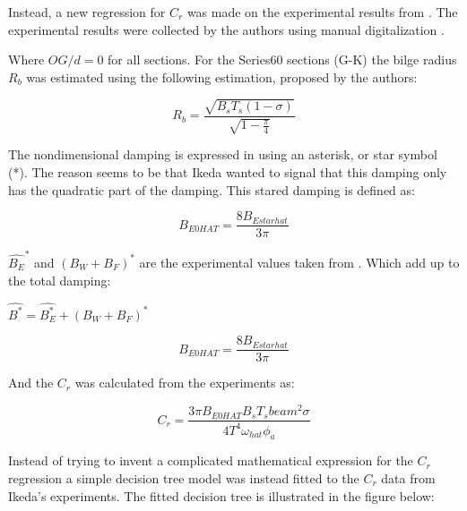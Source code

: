 Instead, a new regression for $C_r$ was made on the experimental
results from \cite{7505983/4AFVVGNT}. The experimental results were
collected by the authors using manual digitalization
\cite{7505983/RXYIE6UW}.

    Where $OG/d=0$ for all sections. For the Series60 sections (G-K) the
bilge radius $R_b$ was estimated using the following estimation,
proposed by the authors:
 
            
    
    \begin{equation}
R_{b} = \frac{\sqrt{B_{s} T_{s} \left(1 - \sigma\right)}}{\sqrt{1 - \frac{\pi}{4}}}
\label{eq:equation}
\end{equation}

    

    The nondimensional damping is expressed in \cite{7505983/4AFVVGNT} using
an asterisk, or star symbol (*). The reason seems to be that Ikeda
wanted to signal that this damping only has the quadratic part of the
damping. This stared damping is defined as:
 
            
    
    \begin{equation}
B_{E0 HAT} = \frac{8 B_{E star hat}}{3 \pi}
\label{eq:equation}
\end{equation}

    

    $\hat{B_E}^*$ and $(B_W+B_F)^*$ are the experimental values taken
from \cite{7505983/4AFVVGNT}. Which add up to the total damping:

    $\hat{B^*} = \hat{B^*_E} + (B_W+B_F)^*$
 
            
    
    \begin{equation}
B_{E0 HAT} = \frac{8 B_{E star hat}}{3 \pi}
\label{eq:equation}
\end{equation}

    

    And the $C_r$ was calculated from the experiments as:
 
            
    
    \begin{equation}
C_{r} = \frac{3 \pi B_{E0 HAT} B_{s} T_{s} beam^{2} \sigma}{4 T^{4} \omega_{hat} \phi_{a}}
\label{eq:equation}
\end{equation}

    

    Instead of trying to invent a complicated mathematical expression for
the $C_r$ regression a simple decision tree model was instead fitted
to the $C_r$ data from Ikeda's experiments. The fitted decision tree
is illustrated in the figure below:

